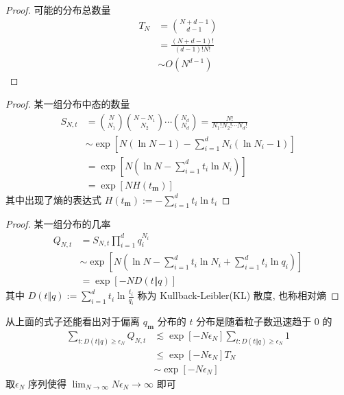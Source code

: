 \documentclass[12pt,hyperref={CJKbookmarks=true}]{beamer}
\renewcommand*{\vec}[1]{\bm{#1}}
\begin{document}
\begin{frame}
    \begin{proof}
        可能的分布总数量
        \begin{align*}
            T_N &= \binom{N+d-1}{d-1} \\
            &=\frac{(N+d-1)!}{(d-1)!N!}\\
            &\sim O(N^{d-1})
        \end{align*}
    \end{proof}

    \begin{proof}
        某一组分布中态的数量
        \begin{align*}
            S_{N,t} &= \binom{N}{N_1}\binom{N-N_1}{N_2}\cdots\binom{N_d}{N_d} 
            = \frac{N!}{N_1!N_2!\cdots N_d!} \\
            &\sim \exp\left[N(\ln N - 1) - \sum_{i=1}^d N_i(\ln N_i - 1)\right]\\
            &= \exp\left[N\left(\ln N - \sum_{i=1}^d t_i\ln N_i\right)\right]\\
            &= \exp\left[N H(t_{\vec m})\right]
        \end{align*}
        其中出现了熵的表达式 $H(t_{\vec m}) := -\sum_{i=1}^d t_i\ln t_i$
    \end{proof}

    \begin{proof}
        某一组分布的几率
        \begin{align*}
            Q_{N,t} &= S_{N,t}\prod_{i=1}^dq_i^{N_i} \\
            &\sim\exp\left[N\left(
                \ln N - \sum_{i=1}^d t_i\ln N_i + \sum_{i=1}^d t_i\ln q_i
            \right)\right] \\
            &= \exp[-ND(t\Vert q)]
        \end{align*}
        其中 $D(t\Vert q) := \sum_{i=1}^d t_i\ln\frac{t_i}{q_i}$ 
        称为 Kullback-Leibler(KL) 散度, 也称相对熵\cite{kullback1951information}
    \end{proof}

    从上面的式子还能看出对于偏离 $q_{\vec m}$ 分布的 $t$ 分布是随着粒子数迅速趋于 $0$ 的
    \begin{align*}
        \sum_{t:D(t\Vert q)\ge\epsilon_N} Q_{N,t} 
        &\lesssim \exp[-N\epsilon_N]\sum_{t:D(t\Vert q)\ge\epsilon_N}1\\
        &\le \exp[-N\epsilon_N] T_N \\
        &\sim \exp[-N\epsilon_N]
    \end{align*}
    取$\epsilon_N$ 序列使得 $\lim_{N\to\infty}N\epsilon_N\to\infty$ 即可 
\end{frame}
\end{document}
